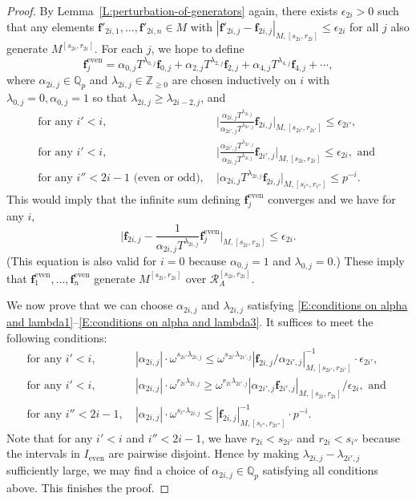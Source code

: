 \documentclass[12pt]{article}
\theoremstyle{definition}
\numberwithin{equation}{theorem}
\newcommand{\calR}{\mathcal{R}}
\newcommand{\QQ}{\mathbb{Q}}
\newcommand{\ZZ}{\mathbb{Z}}
\newcommand{\bbf}{\mathbf{f}}
\newcommand{\even}{\mathrm{even}}
\def\Qp{\QQ_p}
\begin{document}
\begin{proof}
 By Lemma~\ref{L:perturbation-of-generators} again, there exists $\epsilon_{2i}>0$ such that any elements $\bbf'_{2i, 1}, \dots, \bbf'_{2i,n} \in M$ with $|\bbf'_{2i,j} - \bbf_{2i,j}|_{M, [s_{2i}, r_{2i}]}\leq \epsilon_{2i}$ for all $j$ also generate  $M^{[s_{2i}, r_{2i}]}$.  For each $j$, we hope to define
\[
\bbf_j^\even = \alpha_{0,j} T^{\lambda_{0,j}} \bbf_{0,j}+ \alpha_{2,j}T^{\lambda_{2,j}}\bbf_{2, j} + \alpha_{4,j}T^{\lambda_{4,j}} \bbf_{4, j} 
 + \cdots,
\]
where $\alpha_{2i,j} \in \Qp$ and $\lambda_{2i,j} \in \ZZ_{\geq 0}$ are chosen inductively on $i$ with $\lambda_{0,j} = 0, \alpha_{0,j} = 1$ so that $\lambda_{2i,j} \geq \lambda_{2i-2,j}$, and
\begin{align}
\label{E:conditions on alpha and lambda1}
\textrm{for any }i'<i, \ &
\Big|\frac{\alpha_{2i,j}T^{\lambda_{2i,j}}}{\alpha_{2i',j}T^{\lambda_{2i',j}}}\bbf_{2i, j}\Big|_{M,[s_{2i'}, r_{2i'}]}\leq \epsilon_{2i'},\\
\label{E:conditions on alpha and lambda2}
\textrm{for any }i'<i, \ &
\Big|\frac{\alpha_{2i',j}T^{\lambda_{2i',j}}}{\alpha_{2i,j}T^{\lambda_{2i,j}}}\bbf_{2i', j}\Big|_{M,[s_{2i}, r_{2i}]}\leq \epsilon_{2i}, \textrm{ and }\\
\label{E:conditions on alpha and lambda3}
\textrm{for any }i''<2i-1 \textrm{ (even or odd)}, \ &
\big|\alpha_{2i,j}T^{\lambda_{2i,j}}\bbf_{2i,j}\big|_{M, [s_{i''}, r_{i''}]} \leq p^{-i}.
\end{align}
This would imply that the infinite sum defining $\bbf_j^\even$ converges and we have for any $i$,
\[
\Big|\bbf_{2i, j} - \frac 1{\alpha_{2i,j}T^{\lambda_{2i,j}}} \bbf_j^\even\Big|_{M, [s_{2i}, r_{2i}]} \leq \epsilon_{2i}.
\]
(This equation is also valid for $i=0$ because $\alpha_{0,j}=1$ and $\lambda_{0,j}=0$.)
These imply that $\bbf_1^\even, \dots, \bbf_n^\even$ generate $M^{[s_{2i}, r_{2i}]}$ over $\calR_A^{[s_{2i}, r_{2i}]}$.

We now prove that we can choose $\alpha_{2i,j}$ and $\lambda_{2i,j}$ satisfying \eqref{E:conditions on alpha and lambda1}--\eqref{E:conditions on alpha and lambda3}.  It suffices to meet the following conditions:
\begin{align*}
\textrm{for any }i'<i, \ &
|\alpha_{2i,j}|\cdot \omega^{s_{2i'}\lambda_{2i,j}} \leq
\omega^{s_{2i'}\lambda_{2i',j}} |\bbf_{2i, j}/\alpha_{2i',j}|^{-1}_{M,[s_{2i'}, r_{2i'}]} \cdot \epsilon_{2i'},\\
\textrm{for any }i'<i, \ &
|\alpha_{2i,j}|\cdot \omega^{r_{2i}\lambda_{2i,j}} \geq 
\omega^{r_{2i}\lambda_{2i',j}}|\alpha_{2i',j}\bbf_{2i', j}|_{M,[s_{2i}, r_{2i}]} / \epsilon_{2i}, \textrm{ and }\\
\textrm{for any }i''<2i-1, \ &
|\alpha_{2i,j}|\cdot \omega^{s_{i''}\lambda_{2i,j}} \leq
|\bbf_{2i, j}|^{-1}_{M,[s_{i''}, r_{2i''}]} \cdot p^{-i}.
\end{align*}
Note that for any $i'<i$ and $i''<2i-1$, we have $r_{2i}< s_{2i'}$ and $r_{2i}< s_{i''}$ because the intervals in $I_\even$ are pairwise disjoint.  Hence by making $\lambda_{2i,j} - \lambda_{2i',j}$ sufficiently large, we may find a choice of $\alpha_{2i,j} \in \Qp$ satisfying all conditions above.  This finishes the proof.
\end{proof}
\end{document}

